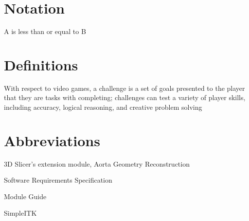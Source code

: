
\section*{Notation}
\begin{description}[font=\rmfamily\bfseries, leftmargin=3cm, style=nextline]
	\item[$A \leq B$] A is less than or equal to B
\end{description}

\section*{Definitions}
\begin{description}[font=\rmfamily\bfseries, leftmargin=3cm, style=nextline]
	\item[Challenge] With respect to video games, a challenge is a set of goals presented to the player that they are tasks with completing; challenges can test a variety of player skills, including accuracy, logical reasoning, and creative problem solving
\end{description}

\section*{Abbreviations}
\begin{description}[font=\rmfamily\bfseries, leftmargin=3cm, style=nextline]
	\item[AortaGeomRecon] 3D Slicer's extension module, Aorta Geometry Reconstruction
	\item[SRS] Software Requirements Specification
	\item[MG] Module Guide
	\item[SITK] SimpleITK
\end{description}